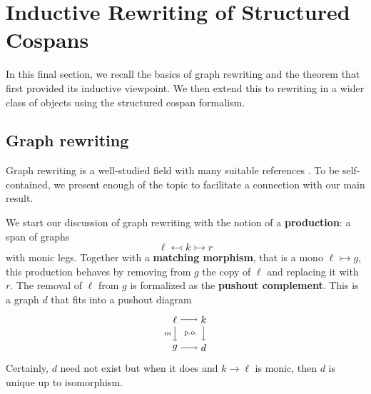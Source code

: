\documentclass{amsart}
\newcommand{\defn}[1]{\textbf{#1}}
\newcommand{\monicto}{\rightarrowtail}
\newcommand{\monicgets}{\leftarrowtail}
\theoremstyle{remark}
\theoremstyle{definition}
\begin{document}

\section{Inductive Rewriting of Structured Cospans}
\label{sec:inductive-rewriting-structured-cospans}

In this final section, we recall the basics of graph rewriting and the
theorem that first provided its inductive viewpoint. We then extend
this to rewriting in a wider class of objects using the structured
cospan formalism.

\subsection{Graph rewriting}
\label{sec:Graph-Rewriting}

Graph rewriting is a well-studied field with many suitable references
\cite{Ehrig_GraphGram,DblPushoutRevis}. To be self-contained, we
present enough of the topic to facilitate a connection with our main
result.

We start our discussion of graph rewriting with the notion of a
\defn{production}: a span of graphs
%
\[
  \ell \monicgets k \monicto r
\]
%
with monic legs. Together with a \defn{matching morphism}, that is a
mono $ \ell \monicto g $, this production behaves by removing from
$ g $ the copy of $ \ell $ and replacing it with $ r $.  The removal
of $ \ell $ from $ g $ is formalized as the \defn{pushout complement}.
This is a graph $ d $ that fits into a pushout diagram
%
\[
  \begin{tikzpicture}
    \node (1) at (0,1) {$ \ell $};
    \node (2) at (1,1) {$ k $};
    \node (3) at (0,0) {$ g $};
    \node (4) at (1,0) {$ d $};
    \draw [->] (1) to node [] {\scriptsize{$  $}} (2);
    \draw [->] (1) to node [left] {\scriptsize{$ m $}} (3);
    \draw [->] (3) to node [] {\scriptsize{$  $}} (4);
    \draw [->] (2) to node [] {\scriptsize{$  $}} (4);
    \node () at (0.5,0.5) {\scriptsize{ p.o. }};
  \end{tikzpicture}
\]
% 
Certainly, $ d $ need not exist but when it does and
$ k \to \ell $ is monic, then $ d $ is unique up to isomorphism.
\end{document}

